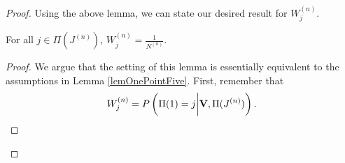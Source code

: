 \begin{proof}

Using the above lemma, we can state our desired result for $W_j^{(n)}$.

\begin{lem}
	\label{lem2}
	For all $j \in \Pi (J^{(n)})$, $W_j^{(n)}=\frac{1}{N^{(n)}}.$
\end{lem}
\begin{proof}
	

We argue that the setting of this lemma is essentially equivalent to the assumptions in Lemma \ref{lemOnePointFive}. First, remember that
\[W_j^{(n)}= P\left(\Pi(1)=j \bigg{|} \textbf{V}, \Pi (J^{(n)})\right).\]


\end{proof}
\end{proof}
